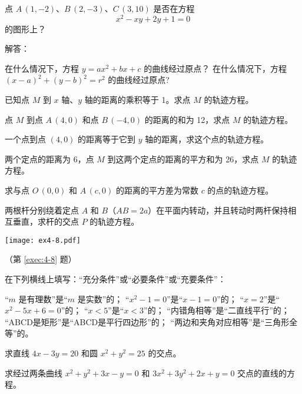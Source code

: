 \begin{Exercise}
  \begin{question}
    \item 点 $A\,(1,-2)$、$B\,(2,-3)$、$C\,(3,10)$ 是否在方程
    \[ x^2-xy+2y+1=0\]
    的图形上？
    \item 解答：
    \begin{tasks}
      \task 在什么情况下，方程 $y=ax^2+bx+c$ 的曲线经过原点？
      \task 在什么情况下，方程 $(x-a)^2+(y-b)^2=r^2$ 的曲线经过原点?
    \end{tasks}
    \item 已知点 $M$ 到 $x$ 轴、$y$ 轴的距离的乘积等于 1。求点 $M$ 的轨迹方程。
    \item 点 $M$ 到点 $A\,(4,0)$ 和点 $B\,(-4,0)$ 的距离的和为 12，求点 $M$ 的轨迹方程。
    \item 一个点到点 $(4,0)$ 的距离等于它到 $y$ 轴的距离，求这个点的轨迹方程。
    \item 两个定点的距离为 6，点 $M$ 到这两个定点的距离的平方和为 26，求点 $M$ 的轨迹方程。
    \item 求与点 $O\,(0,0)$ 和 $A\,(c,0)$ 的距离的平方差为常数 $c$ 的点的轨迹方程。
    \item \label{exec:4-8}两根杆分别绕着定点 $A$ 和 $B$（$AB=2a$）在平面内转动，并且转动时两杆保持相互垂直，求杆的交点 $P$ 的轨迹方程。
    \begin{figurehere}
      \begin{minipage}{\linewidth}\centering
        \texttt{[image: ex4-8.pdf]}
        \caption*{（第 \ref{exec:4-8} 题）}
      \end{minipage}
    \end{figurehere}
    \item 在下列横线上填写：“充分条件”或“必要条件”或“充要条件”：
    \begin{tasks}
      \task “$m$ 是有理数”是“$m$ 是实数”的；
      \task “$x^2-1=0$”是“$x-1=0$”的；
      \task “$x=2$”是“$x^2-5x+6=0$”的；
      \task “$x<5$”是“$x<3$”的；
      \task “内错角相等”是“二直线平行”的；
      \task “ABCD是矩形”是“ABCD是平行四边形”的；
      \task “两边和夹角对应相等”是“三角形全等”的。
    \end{tasks}
    \item 求直线 $4x-3y=20$ 和圆 $x^2+y^2=25$ 的交点。
    \item 求经过两条曲线 $x^2+y^2+3x-y=0$ 和 $3x^2+3y^2+2x+y=0$ 交点的直线的方程。
  \end{question}
\end{Exercise}

